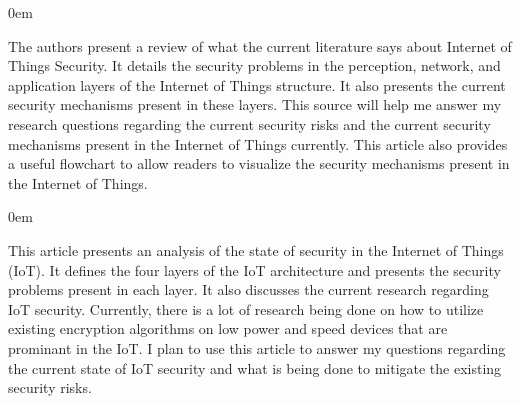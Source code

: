 \documentclass{article}
\newenvironment{annotation}{\begin{addmargin}[2.5em]{0em} \begin{flushleft}}{\end{flushleft} \end{addmargin}}
\begin{document}
\begin{annotation}
The authors present a review of what the current literature says about Internet of Things Security. 
It details the security problems in the perception, network, and application layers of the Internet of Things structure. 
It also presents the current security mechanisms present in these layers. 
This source will help me answer my research questions regarding the current security risks and the current security mechanisms present in the Internet of Things currently.
This article also provides a useful flowchart to allow readers to visualize the security mechanisms present in the Internet of Things.  
\end{annotation}

\begin{annotation}
  This article presents an analysis of the state of security in the Internet of Things (IoT). It defines the four layers of the IoT architecture and presents the security
  problems present in each layer. It also discusses the current research regarding IoT security. Currently, there is a lot of research being done on how to utilize existing
  encryption algorithms on low power and speed devices that are prominant in the IoT. I plan to use this article to answer my questions regarding the current state of IoT
  security and what is being done to mitigate the existing security risks. 
\end{annotation}
\end{document}
